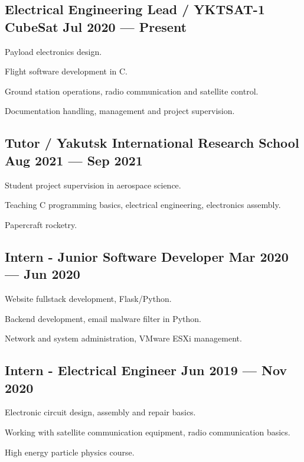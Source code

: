 \documentclass[letter,10pt]{article}
\begin{document}
\subsection{{Electrical Engineering Lead / YKTSAT-1 CubeSat \hfill Jul 2020 --- Present}}
\begin{zitemize}
\item Payload electronics design.
\item Flight software development in C.
\item Ground station operations, radio communication and satellite control.
\item Documentation handling, management and project supervision.
\end{zitemize}

\subsection{{Tutor / Yakutsk International Research School \hfill Aug 2021 --- Sep 2021}}
\begin{zitemize}
\item Student project supervision in aerospace science.
\item Teaching C programming basics, electrical engineering, electronics assembly.
\item Papercraft rocketry.
\end{zitemize}

\subsection{{Intern - Junior Software Developer \hfill Mar 2020 --- Jun 2020}}
\begin{zitemize}
\item Website fullstack development, Flask/Python.
\item Backend development, email malware filter in Python.
\item Network and system administration, VMware ESXi management.
\end{zitemize}

\subsection{{Intern - Electrical Engineer \hfill Jun 2019 --- Nov 2020}}
\begin{zitemize}
\item Electronic circuit design, assembly and repair basics.
\item Working with satellite communication equipment, radio communication basics.
\item High energy particle physics course.
\end{zitemize}
\end{document}
